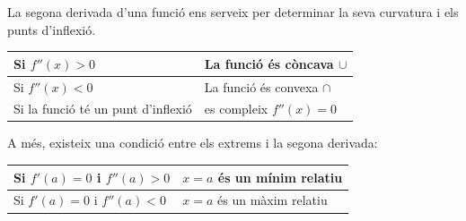	
	\begin{theorybox}
	  La segona derivada d'una funció ens serveix per determinar la seva curvatura i els punts d'inflexió.
	 
	 \begin{center}
	 	\begin{tabular}{p{6cm}| p{8cm}}
	 		Si $f''(x)>0$ & La funció és còncava $\cup$ \\ [0.15cm] \hline
	 		Si $f''(x)<0$ & La funció és convexa $\cap$ \\ [0.15cm] \hline 
	 		Si la funció té un punt d'inflexió  & es compleix $f''(x)=0$
	 	\end{tabular}
	 \end{center}
	 
	 A més, existeix una condició entre els extrems i la segona derivada:
	 \begin{center}
	 	\begin{tabular}{p{6cm}| p{8cm}}
	 		Si $f'(a)=0$ i $f''(a)>0$ & $x=a$ és un mínim relatiu \\ [0.15cm] \hline
	 		Si $f'(a)=0$ i $f''(a)<0$ & $x=a$ és un màxim relatiu  \\ [0.15cm] 
	 	\end{tabular}
	 \end{center} 
	\end{theorybox}
	
